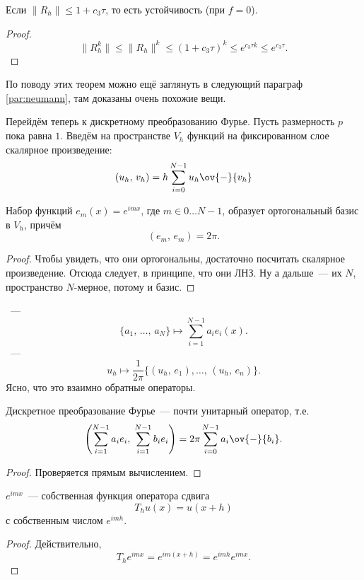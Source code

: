 \documentclass{trlnotes}
\begin{document}
	\begin{cor}
		Если $\|R_h\| \leqslant 1 + c_3\tau$, то есть устойчивость (при $f = 0$).
		\begin{proof}
			\[
				\|R_h^k\| \leqslant \|R_h\|^k \leqslant (1 + c_3 \tau)^k \leqslant e^{c_3 \tau k} \leqslant e^{c_3 \tau}.
			\]
		\end{proof}
	\end{cor}

	По поводу этих теорем можно ещё заглянуть в следующий параграф \ref{par:neumann}, там доказаны очень похожие вещи.

	Перейдём теперь к дискретному преобразованию Фурье. Пусть размерность $p$ пока равна $1$. Введём на пространстве $V_h$ функций на фиксированном слое скалярное произведение:
	\[
		(u_h, \, v_h) = h \sum\limits_{i = 0}^{N - 1} u_h \ov{-}{v_h}
	\]

	\begin{st}
		Набор функций $e_m(x) = e^{imx}$, где $m \in 0\ldots N-1$, образует ортогональный базис в $V_h$, причём
		\[
			(e_m, \, e_m) = 2\pi.
		\]
		\begin{proof}
			Чтобы увидеть, что они ортогональны, достаточно посчитать скалярное произведение. Отсюда следует, в принципе, что они ЛНЗ. Ну а дальше~--- их $N$, пространство $N$-мерное, потому и базис.
		\end{proof}
	\end{st}

	\begin{de}
		~---
		\[
			\{a_1, \, \ldots, \, a_N\} \mapsto \sum\limits_{i = 1}^{N-1} a_i e_i(x).
		\]
		~---
		\[
			u_h \mapsto \dfrac{1}{2\pi}\big\{(u_h, \, e_1), \ldots, \, (u_h, \, e_n)\big\}.
		\]
		Ясно, что это взаимно обратные операторы.
	\end{de}

	\begin{st}
		Дискретное преобразование Фурье~--- почти унитарный оператор, т.е. 
		\[
			\left(\sum\limits_{i = 1}^{N - 1} a_i e_i, \; \sum\limits_{i = 1}^{N - 1} b_i e_i\right) = 2 \pi \sum_{i = 0}^{N - 1} a_i \ov{-}{b_i}.
		\]
		\begin{proof}
			Проверяется прямым вычислением.
		\end{proof}
	\end{st}

	\begin{st}
		$e^{imx}$~--- собственная функция оператора сдвига
		\[
			T_h u(x) = u(x + h)
		\]
		с собственным числом $e^{imh}$.
		\begin{proof}
			Действительно,
			\[
				T_h e^{imx} = e^{im(x + h)} = e^{imh} e^{imx}.
			\]
		\end{proof}
	\end{st}
\end{document}
